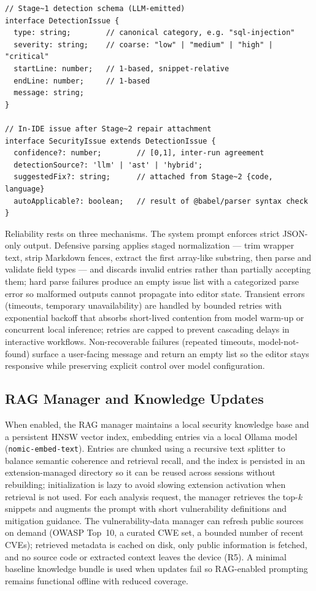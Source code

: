 \begin{lstlisting}[caption={Stage~1 detection schema and the post-stage-2 in-IDE issue shape}, label={lst:cg-issue-schema}]
// Stage~1 detection schema (LLM-emitted)
interface DetectionIssue {
  type: string;        // canonical category, e.g. "sql-injection"
  severity: string;    // coarse: "low" | "medium" | "high" | "critical"
  startLine: number;   // 1-based, snippet-relative
  endLine: number;     // 1-based
  message: string;
}

// In-IDE issue after Stage~2 repair attachment
interface SecurityIssue extends DetectionIssue {
  confidence?: number;        // [0,1], inter-run agreement
  detectionSource?: 'llm' | 'ast' | 'hybrid';
  suggestedFix?: string;      // attached from Stage~2 {code, language}
  autoApplicable?: boolean;   // result of @babel/parser syntax check
}
\end{lstlisting}

Reliability rests on three mechanisms. The system prompt enforces strict JSON-only output. Defensive parsing applies staged normalization --- trim wrapper text, strip Markdown fences, extract the first array-like substring, then parse and validate field types --- and discards invalid entries rather than partially accepting them; hard parse failures produce an empty issue list with a categorized parse error so malformed outputs cannot propagate into editor state. Transient errors (timeouts, temporary unavailability) are handled by bounded retries with exponential backoff that absorbs short-lived contention from model warm-up or concurrent local inference; retries are capped to prevent cascading delays in interactive workflows. Non-recoverable failures (repeated timeouts, model-not-found) surface a user-facing message and return an empty list so the editor stays responsive while preserving explicit control over model configuration.


\subsection{RAG Manager and Knowledge Updates}
\label{subsec:impl-rag-knowledge}

When enabled, the RAG manager maintains a local security knowledge base and a persistent HNSW vector index, embedding entries via a local Ollama model (\texttt{nomic-embed-text}). Entries are chunked using a recursive text splitter to balance semantic coherence and retrieval recall, and the index is persisted in an extension-managed directory so it can be reused across sessions without rebuilding; initialization is lazy to avoid slowing extension activation when retrieval is not used. For each analysis request, the manager retrieves the top-$k$ snippets and augments the prompt with short vulnerability definitions and mitigation guidance. The vulnerability-data manager can refresh public sources on demand (OWASP Top~10, a curated CWE set, a bounded number of recent CVEs); retrieved metadata is cached on disk, only public information is fetched, and no source code or extracted context leaves the device (R5). A minimal baseline knowledge bundle is used when updates fail so RAG-enabled prompting remains functional offline with reduced coverage.

